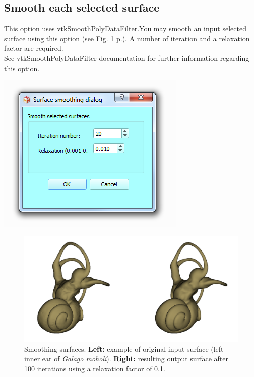 \subsection{Smooth each selected surface}
\noindent
\begin{minipage}{0.5\textwidth}
This option uses vtkSmoothPolyDataFilter.You may smooth an input
selected surface using this option (see Fig. \ref{smooth} p.\pageref{smooth}). A number of iteration and a
relaxation factor are required.\\
See vtkSmoothPolyDataFilter documentation for further information regarding this option.
\end{minipage}    
\begin{minipage}{0.5\textwidth}\centering
  \includegraphics[scale=0.5]{images/09/structure/surface_smoothing_dialog.png}
 \end{minipage} 
\noindent

\begin{figure}
  \centering
  \includegraphics[scale=0.35]{images/09/structure/surface_smoothing_example.png} 
	\caption{Smoothing surfaces. \textbf{Left:} example of original input surface (left inner ear of \textit{Galago moholi}). \textbf{Right:} resulting output surface after 100 iterations using a relaxation factor of 0.1.}
\label{smooth}
 
\end{figure}





